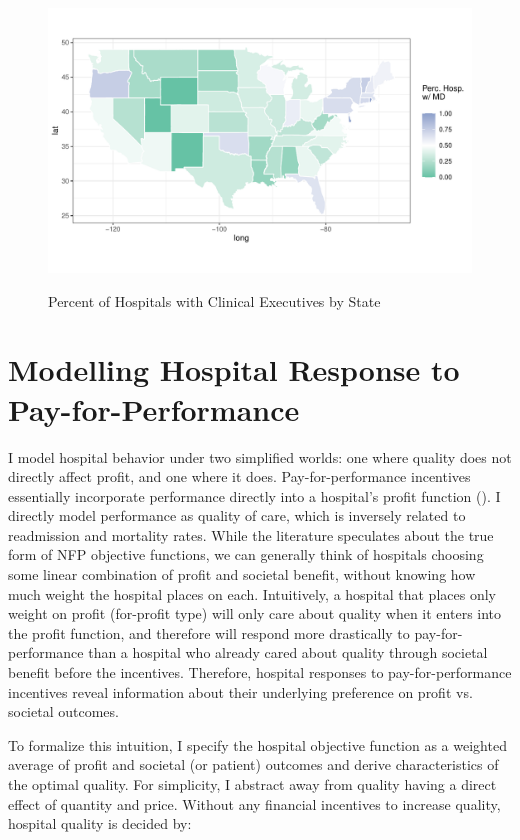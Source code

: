 \documentclass[12pt]{article}
\begin{document}
\begin{figure}[ht!]
    \centering
    \caption{Percent of Hospitals with Clinical Executives by State}
    \includegraphics[width=\textwidth]{Objects/has_doc_avg_map.pdf}
    \label{fig:state_doc}
\end{figure}

\section{Modelling Hospital Response to Pay-for-Performance}\label{sec:model}

    I model hospital behavior under two simplified worlds: one where quality does not directly affect profit, and one where it does. Pay-for-performance incentives essentially incorporate performance directly into a hospital's profit function (\cite{dranove2011health}). I directly model performance as quality of care, which is inversely related to readmission and mortality rates. While the literature speculates about the true form of NFP objective functions, we can generally think of hospitals choosing some linear combination of profit and societal benefit, without knowing how much weight the hospital places on each. Intuitively, a hospital that places only weight on profit (for-profit type) will only care about quality when it enters into the profit function, and therefore will respond more drastically to pay-for-performance than a hospital who already cared about quality through societal benefit before the incentives. Therefore, hospital responses to pay-for-performance incentives reveal information about their underlying preference on profit vs. societal outcomes. 

    To formalize this intuition, I specify the hospital objective function as a weighted average of profit and societal (or patient) outcomes and derive characteristics of the optimal quality. For simplicity, I abstract away from quality having a direct effect of quantity and price. Without any financial incentives to increase quality, hospital quality is decided by:  
    
\end{document}
